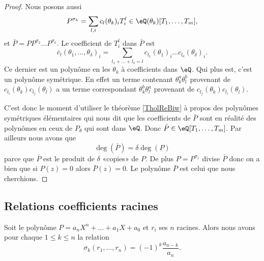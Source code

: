 \begin{proof}
    Nous posons aussi
    \begin{equation}
        P^{\sigma_k}=\sum_{l,i} c_l(\theta_k)_iT_i^l\in \eQ(\theta_k)[T_1,\ldots, T_m],
    \end{equation}
    et \( \bar P=PP^{\sigma_2}\ldots P^{\sigma_k}\). Le coefficient de \( T_i^l\) dans \( \bar P\) est
    \begin{equation}
        \bar c_l(\theta_1,\ldots, \theta_{\delta})_i=\sum_{l_1+\ldots +l_{\delta}=l}c_{l_1}(\theta_1)_i\ldots c_{l_{\delta}}(\theta_{\delta})_i.
    \end{equation}
    Ce dernier est un polynôme en les \( \theta_k\) à coefficients dans \( \eQ\). Qui plus est, c'est un polynôme symétrique. En effet un terme contenant \( \theta_k^a\theta_l^b\) provenant de \( c_{l_i}(\theta_k)c_{l_j}(\theta_l)\) a un terme correspondant \( \theta_k^b\theta_l^a\) provenant de \( c_{l_j}(\theta_k)c_{l_i}(\theta_l)\).

    C'est donc le moment d'utiliser le théorème \ref{TholReBiw} à propos des polynômes symétriques élémentaires qui nous dit que les coefficients de \( \bar P\) sont en réalité des polynômes en ceux de \( P_{\theta}\) qui sont dans \( \eQ\). Donc \( \bar P\in \eQ[T_1,\ldots, T_m]\). Par ailleurs nous avons que
    \begin{equation}
        \deg(\bar P)=\delta \deg(P)
    \end{equation}
    parce que \( \bar P\) est le produit de \( \delta\) «copies»  de \( P\). De plus \( P=P^{\sigma_1}\) divise \( \bar P \) donc on a bien que si \( P(z)=0\) alors \( \bar P(z)=0\). Le polynôme \( \bar P\) est celui que nous cherchions. 
\end{proof}

\subsection{Relations coefficients racines}

\begin{theorem} \label{ThoOQRgjpl}
    Soit le polynôme \( P=a_nX^n+\ldots +a_1X+a_0\) et \( r_i\) ses \( n\) racines. Alors nous avons pour chaque \( 1\leq k\leq n\) la relation
    \begin{equation}
        \sigma_k(r_1,\ldots, r_n)=(-1)^k\frac{ a_{n-k} }{ a_n }.
    \end{equation}
\end{theorem}

